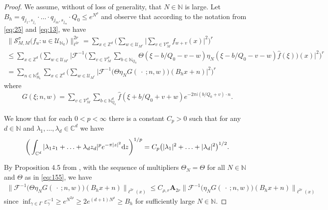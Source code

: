 \documentclass[a4paper,oneside]{amsart}
\theoremstyle{plain}
\theoremstyle{definition}
\numberwithin{equation}{section}
\theoremstyle{plain}
\newcommand{\ZZ}{\mathbb{Z}}
\newcommand{\CC}{\mathbb{C}}
\newcommand{\NN}{\mathbb{N}}
\newcommand{\calF}{\mathcal{F}}
\newcommand{\8}{\infty}
\begin{document}
\begin{proof}
We assume, without of loss of generality, that $N\in\NN$ is large.
Let $B_h=q_{j_1, s_{j_1}}\cdot\ldots\cdot q_{j_m,
  s_{j_m}}\cdot Q_0\le e^{N^{\rho}}$
and observe that according to the notation from \eqref{eq:25} and \eqref{eq:13},  we
have
\begin{multline}
  \label{eq:136}
  \big\|\mathcal S_{M, M}^{\sigma}\big(f_u:u\in\mathcal
  U_{\NN_k}\big)\big\|_{\ell^{2r}}^{2r}=
\sum_{x\in\ZZ^d}\bigg(\sum_{w\in\mathcal
  U_{M^c}}\Big|\sum_{v\in\mathcal V_{M}^{\sigma}}f_{w+v}(x)\Big|^2\bigg)^r\\
\le\sum_{x\in\ZZ^d}\bigg(\sum_{w\in\mathcal
  U_{M^c}}\Big|\calF^{-1}\Big(\sum_{v\in\mathcal V_{M}^{\sigma}}\sum_{b\in\NN_{Q_0}}\Theta(\xi-b/Q_0-v-w)\eta_N(\xi-b/Q_0-v-w)\hat{f}(\xi)\Big)(x)\Big|^2\bigg)^r\\
=\sum_{n\in \NN_{B_h}^d}\sum_{x\in\ZZ^d}\bigg(\sum_{w\in\mathcal
  U_{M^c}}\big|\calF^{-1}\big(\Theta\eta_N G(\: \cdot\: ;n, w)\big)(B_hx+n)\big|^2\bigg)^r
\end{multline}
where 
\begin{align}
  \label{eq:137}
  G(\xi; n, w)=\sum_{v\in\mathcal V_{M}^{\sigma}}\sum_{b\in\NN_{Q_0}^d}\hat{f}(\xi+b/Q_0+v+w)e^{-2\pi i
(b/Q_0+v)\cdot n}.
\end{align}

We  know that for each $0<p<\infty$ there is a constant $C_p>0$ such
that for any $d\in\NN$ and $\lambda_1,\ldots,\lambda_d\in\CC^d$ we have
\begin{align}
  \label{eq:1411}
  \bigg(\int_{\CC^d}|\lambda_1z_1+\ldots+\lambda_dz_d|^pe^{-\pi
  |z|^2} {\rm d} z\bigg)^{1/p}=C_p\big(|\lambda_1|^2+\ldots+|\lambda_d|^2\big)^{1/2}.
\end{align}

By Proposition 4.5 from \cite{mst1}, with the sequence of multipliers
$\Theta_N=\Theta$ for all $N\in\NN$ and $\Theta$ as in \eqref{eq:155},   we have 
\begin{align}
\label{eq:140}
\big\|\calF^{-1}\big(\Theta\eta_N G(\: \cdot\: ;n,
w)\big)(B_hx+n)\big\|_{\ell^{2r}(x)}\le C_{\rho, r}\mathbf A_{2r}
\big\|\calF^{-1}\big(\eta_N G(\: \cdot\: ;n, w)\big)(B_hx+n)\big\|_{\ell^{2r}(x)}
\end{align}
since $\inf_{\gamma\in\Gamma}\varepsilon_{\gamma}^{-1}\ge
e^{N^{2\rho}}\ge 2e^{(d+1)N^{\rho}}\ge B_h$ for sufficiently large
$N\in\NN$. 


\end{proof}
\end{document}
